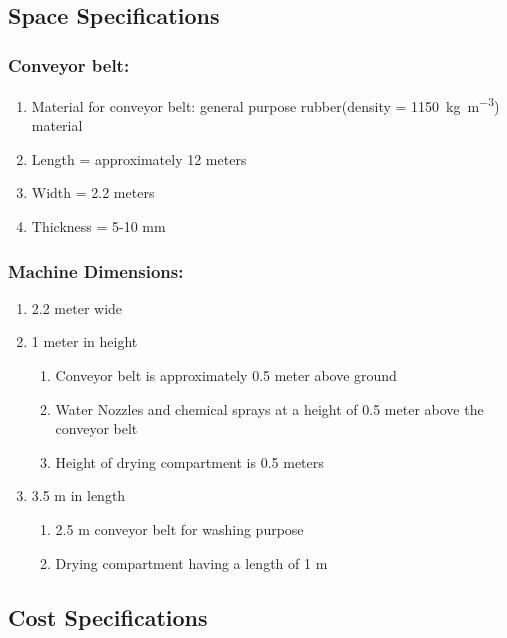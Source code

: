 \documentclass[12pt]{article} %
\begin{document}
\subsection{Space Specifications}


   \subsubsection{Conveyor belt:} 
   \begin{enumerate}
   \item Material for conveyor belt: general purpose rubber(density = \SI{1150}{\kg\per\cubic\m}) material
\item Length = approximately 12 meters

\item Width = 2.2 meters

\item Thickness = 5-10 mm

\end{enumerate}

\subsubsection{Machine Dimensions:} 
    \begin{enumerate}
        \item 2.2 meter wide
        \item 1 meter in height
        \begin{enumerate}
            \item Conveyor belt is approximately 0.5 meter above ground
            \item Water Nozzles and chemical sprays at a height of 0.5 meter above the conveyor belt
            \item Height of drying compartment is 0.5 meters
        \end{enumerate}
        \item 3.5 m in length
        \begin{enumerate}
            \item 2.5 m conveyor belt for washing purpose
            \item Drying compartment having a length of 1 m
        \end{enumerate}
    \end{enumerate}


\subsection{Cost Specifications}
\end{document}

